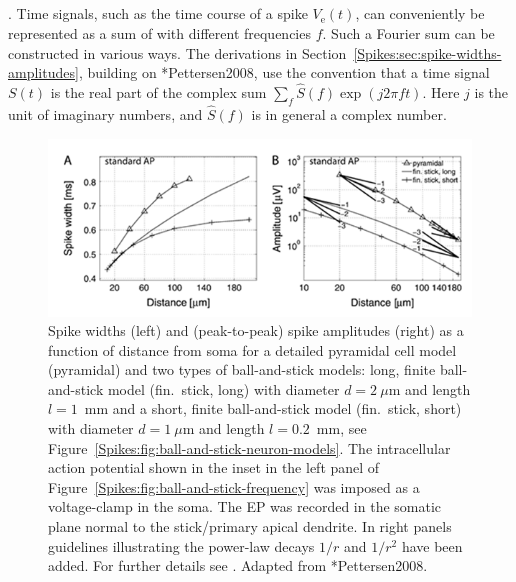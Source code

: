 \subsection{}
.
Time signals, such as the time course of a spike $V_\mathrm{e}(t)$,  can conveniently 
be represented as a sum of  with different frequencies $f$. 
Such a Fourier sum can be constructed in
various ways. The derivations in 
Section~\ref{Spikes:sec:spike-widths-amplitudes}, building on \citeasnoun**{Pettersen2008}, use the  
convention that a time signal $S(t)$ is the real part of the complex sum $\sum_{f}  \hat{S}(f) \exp (j 2 \pi f t)$. 
Here $j$ is the unit of imaginary numbers, and  $\hat{S}(f)$ is in general a complex number. 
%

\begin{figure}[!ht]
\begin{center}
\includegraphics{Figures/Spikes/Spikes-ball-and-stick-results-w100-r150}
\end{center}
\caption[]{
Spike widths (left) and (peak-to-peak) spike amplitudes (right) as a function of
distance from soma for a detailed pyramidal cell model (pyramidal) and two
types of ball-and-stick models: long, finite ball-and-stick
model (fin.~stick, long) with diameter $d=2~\mu$m and length
$l=1$~mm and a short, finite ball-and-stick model (fin.~stick, short) with diameter $d=1~\mu$m and length $l=0.2$~mm,
see Figure~\ref{Spikes:fig:ball-and-stick-neuron-models}.
The intracellular action potential shown in the inset in the left panel of 
Figure~\ref{Spikes:fig:ball-and-stick-frequency} was imposed as a voltage-clamp in the soma.
The EP was recorded in the
somatic plane normal to the stick/primary apical dendrite. 
In right panels guidelines illustrating the power-law decays $1/r$ and
$1/r^{2}$ have been added. 
For further details see .
Adapted from \citeasnoun**{Pettersen2008}.
}
\label{Spikes:fig:ball-and-stick-results}
\end{figure}


